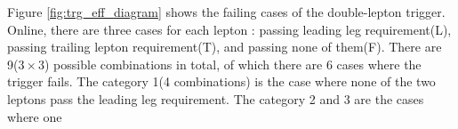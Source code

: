 Figure \ref{fig:trg_eff_diagram} shows the failing cases of the double-lepton trigger. 
Online, there are three cases for each lepton : passing leading leg requirement(L), 
passing trailing lepton requirement(T), and passing none of them(F). 
There are 9($3\times3$) possible combinations in total, of which there are 6 cases 
where the trigger fails. The category 1(4 combinations) is the case where none of the 
two leptons pass the leading leg requirement. The category 2 and 3 are the cases where one 
